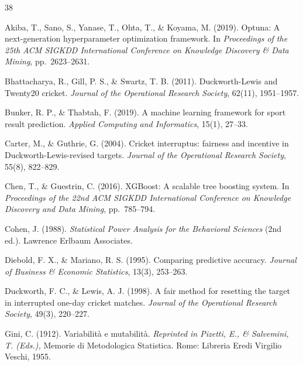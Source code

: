 \documentclass[10pt,a4paper,twocolumn]{article}
\begin{document}

\begin{thebibliography}{38}

Akiba, T., Sano, S., Yanase, T., Ohta, T., \& Koyama, M. (2019).
\newblock Optuna: A next-generation hyperparameter optimization framework.
\newblock In \textit{Proceedings of the 25th ACM SIGKDD International Conference on Knowledge Discovery \& Data Mining}, pp.\ 2623--2631.

Bhattacharya, R., Gill, P. S., \& Swartz, T. B. (2011).
\newblock Duckworth-Lewis and Twenty20 cricket.
\newblock \textit{Journal of the Operational Research Society}, 62(11), 1951--1957.

Bunker, R. P., \& Thabtah, F. (2019).
\newblock A machine learning framework for sport result prediction.
\newblock \textit{Applied Computing and Informatics}, 15(1), 27--33.

Carter, M., \& Guthrie, G. (2004).
\newblock Cricket interruptus: fairness and incentive in Duckworth-Lewis-revised targets.
\newblock \textit{Journal of the Operational Research Society}, 55(8), 822--829.

Chen, T., \& Guestrin, C. (2016).
\newblock XGBoost: A scalable tree boosting system.
\newblock In \textit{Proceedings of the 22nd ACM SIGKDD International Conference on Knowledge Discovery and Data Mining}, pp.\ 785--794.

Cohen, J. (1988).
\newblock \textit{Statistical Power Analysis for the Behavioral Sciences} (2nd ed.).
\newblock Lawrence Erlbaum Associates.

Diebold, F. X., \& Mariano, R. S. (1995).
\newblock Comparing predictive accuracy.
\newblock \textit{Journal of Business \& Economic Statistics}, 13(3), 253--263.

Duckworth, F. C., \& Lewis, A. J. (1998).
\newblock A fair method for resetting the target in interrupted one-day cricket matches.
\newblock \textit{Journal of the Operational Research Society}, 49(3), 220--227.

Gini, C. (1912).
\newblock Variabilità e mutabilità.
\newblock \textit{Reprinted in Pizetti, E., \& Salvemini, T. (Eds.),} Memorie di Metodologica Statistica.
\newblock Rome: Libreria Eredi Virgilio Veschi, 1955.


\end{thebibliography}
\end{document}
